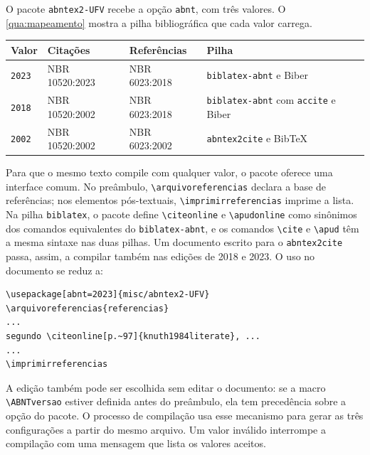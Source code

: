 \documentclass[
	article,
	12pt,
	oneside,
	a4paper,
	english,
	brazil,
]{abntex2}
\begin{document}
O pacote \texttt{abntex2-UFV} recebe a opção \texttt{abnt}, com três valores. O \autoref{qua:mapeamento} mostra a pilha bibliográfica que cada valor carrega.

\begin{quadro}[htbp]
	\caption{Valores da opção \texttt{abnt} e pilha bibliográfica correspondente}\label{qua:mapeamento}
	\centering
	\footnotesize
	\begin{tabular}{L{0.08\textwidth}L{0.2\textwidth}L{0.17\textwidth}L{0.41\textwidth}}
		\toprule
		\textbf{Valor} & \textbf{Citações} & \textbf{Referências} & \textbf{Pilha} \\
		\midrule
		\texttt{2023} & NBR 10520:2023 & NBR 6023:2018 & \texttt{biblatex-abnt} e Biber \\
		\texttt{2018} & NBR 10520:2002 & NBR 6023:2018 & \texttt{biblatex-abnt} com \texttt{accite} e Biber \\
		\texttt{2002} & NBR 10520:2002 & NBR 6023:2002 & \texttt{abntex2cite} e Bib\TeX \\
		\bottomrule
	\end{tabular}
\end{quadro}

Para que o mesmo texto compile com qualquer valor, o pacote oferece uma interface comum. No preâmbulo, \verb|\arquivoreferencias| declara a base de referências; nos elementos pós-textuais, \verb|\imprimirreferencias| imprime a lista. Na pilha \texttt{biblatex}, o pacote define \verb|\citeonline| e \verb|\apudonline| como sinônimos dos comandos equivalentes do \texttt{biblatex-abnt}, e os comandos \verb|\cite| e \verb|\apud| têm a mesma sintaxe nas duas pilhas. Um documento escrito para o \texttt{abntex2cite} passa, assim, a compilar também nas edições de 2018 e 2023. O uso no documento se reduz a:

\begin{verbatim}
\usepackage[abnt=2023]{misc/abntex2-UFV}
\arquivoreferencias{referencias}
...
segundo \citeonline[p.~97]{knuth1984literate}, ...
...
\imprimirreferencias
\end{verbatim}

A edição também pode ser escolhida sem editar o documento: se a macro \verb|\ABNTversao| estiver definida antes do preâmbulo, ela tem precedência sobre a opção do pacote. O processo de compilação usa esse mecanismo para gerar as três configurações a partir do mesmo arquivo. Um valor inválido interrompe a compilação com uma mensagem que lista os valores aceitos.
\end{document}

